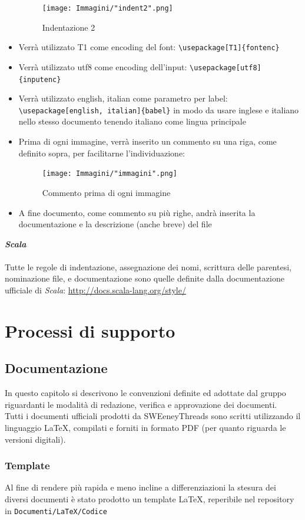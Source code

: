 \documentclass[a4paper]{report}
\newcommand{\mychapter}[2]{
    \setcounter{chapter}{#1}
    \setcounter{section}{0}
    \setcounter{subsection}{1}
    \chapter*{#2}
    \addcontentsline{toc}{chapter}{#2}
}
\begin{document}
\begin{itemize}
\begin{figure}[h!]
						\texttt{[image: Immagini/"indent2".png]}
						\caption{Indentazione 2}
					\end{figure}
					\item Verrà utilizzato T1 come encoding del font: \verb|\usepackage[T1]{fontenc}|
					\item Verrà utilizzato utf8 come encoding dell'input: \verb|\usepackage[utf8]{inputenc}|
					\item Verrà utilizzato english, italian come parametro per label: \verb|\usepackage[english, italian]{babel}| in modo da 
					usare inglese e italiano nello stesso documento tenendo italiano come lingua principale
					\item Prima di ogni immagine, verrà inserito un commento su una riga, come definito sopra, per facilitarne l'individuazione:
					\begin{figure}[h!]
						\centering
						\texttt{[image: Immagini/"immagini".png]}
						\caption{Commento prima di ogni immagine}
					\end{figure}
					\item A fine documento, come commento su più righe, andrà inserita la documentazione e la descrizione (anche breve) del file
				\end{itemize}
				\textbf{\emph{Scala}} \\ \\ 
				Tutte le regole di indentazione, assegnazione dei nomi, scrittura delle parentesi, nominazione file, e documentazione sono quelle
				definite dalla documentazione ufficiale di \emph{Scala}: \url{http://docs.scala-lang.org/style/}
	\mychapter{3}{Processi di supporto}
		\section{Documentazione} %
			In questo capitolo si descrivono le convenzioni definite ed adottate dal gruppo riguardanti le 
			modalità di redazione, verifica e approvazione dei documenti. \\
			Tutti i documenti ufficiali prodotti da SWEeneyThreads sono scritti utilizzando il linguaggio \LaTeX{}, compilati e
			 forniti in formato PDF (per quanto riguarda le versioni digitali).
			\subsection{Template}
				Al fine di rendere più rapida e meno incline a differenziazioni la stesura dei diversi documenti è stato prodotto un
				 template \LaTeX, reperibile nel repository in \verb|Documenti/LaTeX/Codice| %
\end{document}
